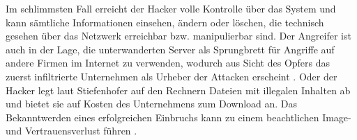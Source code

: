 Im schlimmsten Fall erreicht der Hacker volle Kontrolle über das System und kann
sämtliche Informationen einsehen, ändern oder löschen, die technisch gesehen
über das Netzwerk erreichbar bzw. manipulierbar sind. Der Angreifer ist \zB{}
auch in der Lage, die unterwanderten Server als Sprungbrett für Angriffe auf
andere Firmen im Internet zu verwenden, wodurch aus Sicht des Opfers das zuerst
infiltrierte Unternehmen als Urheber der Attacken erscheint
\cite[S.~364--365]{Sta01}. Oder der Hacker legt laut Stiefenhofer auf den
Rechnern Dateien mit illegalen Inhalten ab und bietet sie auf Kosten des
Unternehmens zum Download an. Das Bekanntwerden eines erfolgreichen Einbruchs
kann zu einem beachtlichen Image- und Vertrauensverlust führen
\cite[S.~38]{ScO97}.
 






